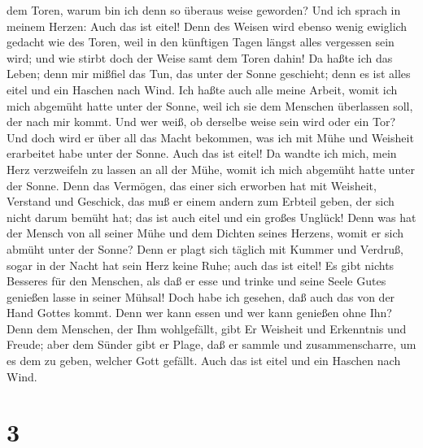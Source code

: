 dem Toren, warum bin ich denn so überaus weise geworden? Und ich sprach
in meinem Herzen: Auch das ist eitel!  Denn des Weisen
wird ebenso wenig ewiglich gedacht wie des Toren, weil in den künftigen
Tagen längst alles vergessen sein wird; und wie stirbt doch der Weise
samt dem Toren dahin!  Da haßte ich das Leben; denn mir
mißfiel das Tun, das unter der Sonne geschieht; denn es ist alles eitel
und ein Haschen nach Wind.  Ich haßte auch alle meine
Arbeit, womit ich mich abgemüht hatte unter der Sonne, weil ich sie dem
Menschen überlassen soll, der nach mir kommt.  Und wer
weiß, ob derselbe weise sein wird oder ein Tor? Und doch wird er über
all das Macht bekommen, was ich mit Mühe und Weisheit erarbeitet habe
unter der Sonne. Auch das ist eitel!  Da wandte ich mich,
mein Herz verzweifeln zu lassen an all der Mühe, womit ich mich abgemüht
hatte unter der Sonne.  Denn das Vermögen, das einer sich
erworben hat mit Weisheit, Verstand und Geschick, das muß er einem
andern zum Erbteil geben, der sich nicht darum bemüht hat; das ist auch
eitel und ein großes Unglück!  Denn was hat der Mensch
von all seiner Mühe und dem Dichten seines Herzens, womit er sich abmüht
unter der Sonne?  Denn er plagt sich täglich mit Kummer
und Verdruß, sogar in der Nacht hat sein Herz keine Ruhe; auch das ist
eitel!  Es gibt nichts Besseres für den Menschen, als daß
er esse und trinke und seine Seele Gutes genießen lasse in seiner
Mühsal! Doch habe ich gesehen, daß auch das von der Hand Gottes kommt.
 Denn wer kann essen und wer kann genießen ohne Ihn?
 Denn dem Menschen, der Ihm wohlgefällt, gibt Er Weisheit
und Erkenntnis und Freude; aber dem Sünder gibt er Plage, daß er sammle
und zusammenscharre, um es dem zu geben, welcher Gott gefällt. Auch das
ist eitel und ein Haschen nach Wind.

\hypertarget{section-2}{%
\section{3}\label{section-2}}

